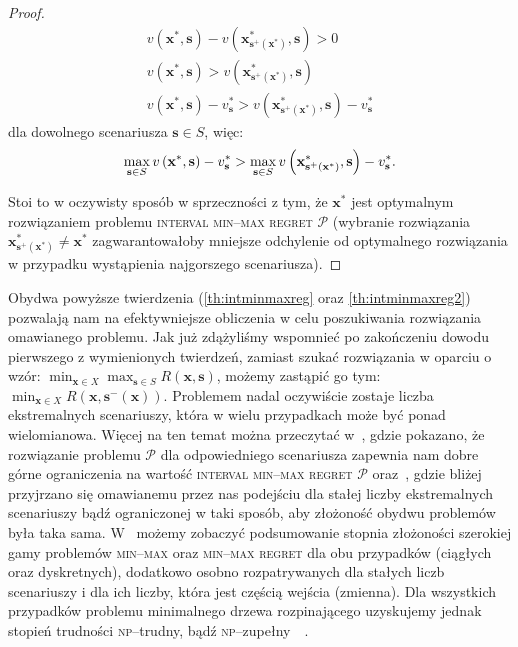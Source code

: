 \begin{proof}
	\begin{gather*}
	v \left( \textbf{x}^{\ast}, \textbf{s} \right) - v \left( \textbf{x}^{\ast}_{\textbf{s}^{+} \left( \textbf{x}^{\ast} \right)}, \textbf{s} \right) > 0 \\
	v \left( \textbf{x}^{\ast}, \textbf{s} \right) > v \left( \textbf{x}^{\ast}_{\textbf{s}^{+} \left( \textbf{x}^{\ast} \right)}, \textbf{s} \right) \\
	v \left( \textbf{x}^{\ast}, \textbf{s} \right) - v^{\ast}_{\textbf{s}} > v \left( \textbf{x}^{\ast}_{\textbf{s}^{+} \left( \textbf{x}^{\ast} \right)}, \textbf{s} \right) - v^{\ast}_{\textbf{s}}
	\end{gather*}
	dla dowolnego scenariusza $\textbf{s} \in S$, więc:
	\begin{equation*}
			\max_{\mathclap{\textbf{s} \in S}} v \left( \textbf{x}^{\ast}, \textbf{s} \right) - v^{\ast}_{\textbf{s}} > \max_{\mathclap{\textbf{s} \in S}} v \left( \textbf{x}^{\ast}_{\textbf{s}^{+} \left( \textbf{x}^{\ast} \right)}, \textbf{s} \right) - v^{\ast}_{\textbf{s}}\text{.}
	\end{equation*}
	
	Stoi to w oczywisty sposób w sprzeczności z tym, że $\textbf{x}^{\ast}$ jest optymalnym rozwiązaniem problemu \textsc{interval min--max regret $\mathcal{P}$} (wybranie rozwiązania $\textbf{x}^{\ast}_{\textbf{s}^{+} \left( \textbf{x}^{\ast} \right)} \neq \textbf{x}^{\ast}$ zagwarantowałoby mniejsze odchylenie od optymalnego rozwiązania w przypadku wystąpienia najgorszego scenariusza).
\end{proof}

Obydwa powyższe twierdzenia (\ref{th:intminmaxreg} oraz \ref{th:intminmaxreg2}) pozwalają nam na efektywniejsze obliczenia w celu poszukiwania rozwiązania omawianego problemu. Jak już zdążyliśmy wspomnieć po zakończeniu dowodu pierwszego z wymienionych twierdzeń, zamiast szukać rozwiązania w oparciu o wzór: $\min_{\textbf{x} \in X} \max_{\textbf{s} \in S} R \left( \textbf{x}, \textbf{s} \right)$, możemy zastąpić go tym: $\min_{\textbf{x} \in X} R \left( \textbf{x}, \textbf{s}^{-} \left( \textbf{x} \right) \right)$. Problemem nadal oczywiście zostaje liczba ekstremalnych scenariuszy, która w wielu przypadkach może być ponad wielomianowa. Więcej na ten temat można przeczytać w~\cite{intervalregMST}, gdzie pokazano, że rozwiązanie problemu $\mathcal{P}$ dla odpowiedniego scenariusza zapewnia nam dobre górne ograniczenia na wartość \textsc{interval min--max regret $\mathcal{P}$} oraz~\cite{intervalregMST2}, gdzie bliżej przyjrzano się omawianemu przez nas podejściu dla stałej liczby ekstremalnych scenariuszy bądź ograniczonej w taki sposób, aby złożoność obydwu problemów była taka sama. W~\cite[$433$--$434$]{minmaxSurvey} możemy zobaczyć podsumowanie stopnia złożoności szerokiej gamy problemów \textsc{min--max} oraz \textsc{min--max regret} dla obu przypadków (ciągłych oraz dyskretnych), dodatkowo osobno rozpatrywanych dla stałych liczb scenariuszy i dla ich liczby, która jest częścią wejścia (zmienna). Dla wszystkich przypadków problemu minimalnego drzewa rozpinającego uzyskujemy jednak stopień trudności \textsc{np}--trudny, bądź \textsc{np}--zupełny~\cite{minmaxApprox}~\cite{intervalregMST2}.

